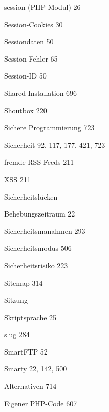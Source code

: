 \documentclass{book}
\renewcommand\subitem{\par}
\begin{document}
\begin{multicols}{2}
\begin{osp-index}
  \item session (PHP-Modul)\hspace{1mm} 26
  \item Session-Cookies\hspace{1mm} 30
  \item Sessiondaten\hspace{1mm} 50
  \item Session-Fehler\hspace{1mm} 65
  \item Session-ID\hspace{1mm} 50
  \item Shared Installation\hspace{1mm} 696
  \item Shoutbox\hspace{1mm} 220
  \item Sichere Programmierung\hspace{1mm} 723
  \item Sicherheit\hspace{1mm} 92, 117, 177, 421, 723
    \subitem fremde RSS-Feeds\hspace{1mm} 211
    \subitem XSS\hspace{1mm} 211
  \item Sicherheitsl\"ucken
    \subitem Behebungszeitraum\hspace{1mm} 22
  \item Sicherheitsma\IeC {\ss }nahmen\hspace{1mm} 293
  \item Sicherheitsmodus\hspace{1mm} 506
  \item Sicherheitsrisiko\hspace{1mm} 223
  \item Sitemap\hspace{1mm} 314
  \item Sitzung\hspace{1mm} 
  \item Skriptsprache\hspace{1mm} 25
  \item slug\hspace{1mm} 284
  \item SmartFTP\hspace{1mm} 52
  \item Smarty\hspace{1mm} 22, 142, 500
    \subitem Alternativen\hspace{1mm} 714
    \subitem Eigener PHP-Code\hspace{1mm} 607

\end{osp-index}
\end{multicols}
\end{document}
